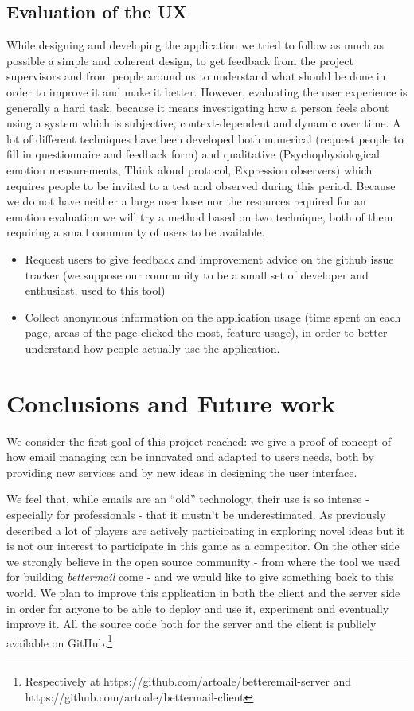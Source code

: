 \documentclass[a4paper,12pt]{report}
\begin{document}

\section{Evaluation of the UX}
While designing and developing the application we tried to follow as much as possible a simple and coherent design, to get feedback from the project supervisors and from people around us to understand what should be done in order to improve it and make it better.
However, evaluating the user experience is generally a hard task, because it means investigating how a person feels about using a system which is subjective, context-dependent and dynamic over time.
A lot of different techniques have been developed both numerical (request people to fill in questionnaire and feedback form) and qualitative (Psychophysiological emotion measurements, Think aloud protocol, Expression observers) which requires people to be invited to a test and observed during this period.
Because we do not have neither a large user base nor the resources required for an emotion evaluation we will try a method based on two technique, both of them requiring a small community of users to be available.
\begin{itemize}
  \item Request users to give feedback and improvement advice on the github issue tracker (we suppose our community to be a small set of developer and enthusiast, used to this tool)
  \item Collect anonymous information on the application usage (time spent on each page, areas of the page clicked the most, feature usage), in order to better understand how people actually use the application.
\end{itemize}

\chapter{Conclusions and Future work}
We consider the first goal of this project reached: we give a proof of concept of how email managing can be innovated and adapted to users needs, both by providing new services and by new ideas in designing the user interface.

We feel that, while emails are an ``old'' technology, their use is so intense - especially for professionals - that it mustn't be underestimated. As previously described a lot of players are actively participating in exploring novel ideas but it is not our interest to participate in this game as a competitor. 
On the other side we strongly believe in the open source community - from where the tool we used for building \emph{bettermail} come - and we would like to give something back to this world. We plan to improve this application in both the client and the server side in order for anyone to be able to deploy and use it, experiment and eventually improve it.
All the source code both for the server and the client is publicly available on GitHub.\footnote{Respectively at https://github.com/artoale/betteremail-server and https://github.com/artoale/bettermail-client}
\end{document}
